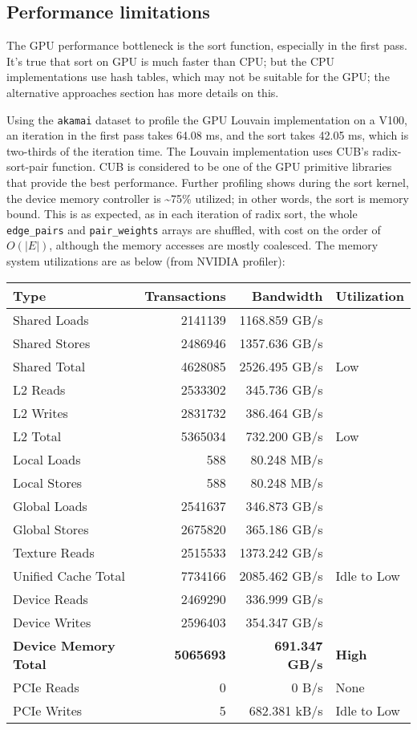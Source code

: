 \documentclass[10pt,oneside]{memoir}
\begin{document}
\hypertarget{performance-limitations-4}{%
\subsection{Performance limitations}\label{performance-limitations-4}}

The GPU performance bottleneck is the sort function, especially in the
first pass. It's true that sort on GPU is much faster than CPU; but the
CPU implementations use hash tables, which may not be suitable for the
GPU; the alternative approaches section has more details on this.

Using the \texttt{akamai} dataset to profile the GPU Louvain
implementation on a V100, an iteration in the first pass takes 64.08 ms,
and the sort takes 42.05 ms, which is two-thirds of the iteration time.
The Louvain implementation uses CUB's radix-sort-pair function. CUB is
considered to be one of the GPU primitive libraries that provide the
best performance. Further profiling shows during the sort kernel, the
device memory controller is \textasciitilde{}75\% utilized; in other
words, the sort is memory bound. This is as expected, as in each
iteration of radix sort, the whole \texttt{edge\_pairs} and
\texttt{pair\_weights} arrays are shuffled, with cost on the order of
\(O(|E|)\), although the memory accesses are mostly coalesced. The
memory system utilizations are as below (from NVIDIA profiler):

\begin{longtable}[]{@{}lrrl@{}}
\toprule
Type & Transactions & Bandwidth & Utilization\tabularnewline
\midrule
\endhead
Shared Loads & 2141139 & 1168.859 GB/s &\tabularnewline
Shared Stores & 2486946 & 1357.636 GB/s &\tabularnewline
Shared Total & 4628085 & 2526.495 GB/s & Low\tabularnewline
L2 Reads & 2533302 & 345.736 GB/s &\tabularnewline
L2 Writes & 2831732 & 386.464 GB/s &\tabularnewline
L2 Total & 5365034 & 732.200 GB/s & Low\tabularnewline
Local Loads & 588 & 80.248 MB/s &\tabularnewline
Local Stores & 588 & 80.248 MB/s &\tabularnewline
Global Loads & 2541637 & 346.873 GB/s &\tabularnewline
Global Stores & 2675820 & 365.186 GB/s &\tabularnewline
Texture Reads & 2515533 & 1373.242 GB/s &\tabularnewline
Unified Cache Total & 7734166 & 2085.462 GB/s & Idle to
Low\tabularnewline
Device Reads & 2469290 & 336.999 GB/s &\tabularnewline
Device Writes & 2596403 & 354.347 GB/s &\tabularnewline
\textbf{Device Memory Total} & \textbf{5065693} & \textbf{691.347 GB/s}
& \textbf{High}\tabularnewline
PCIe Reads & 0 & 0 B/s & None\tabularnewline
PCIe Writes & 5 & 682.381 kB/s & Idle to Low\tabularnewline
\bottomrule
\end{longtable}
\end{document}
